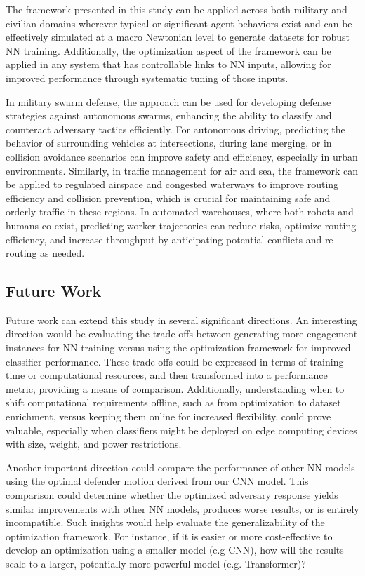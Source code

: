 \documentclass[journal]{IEEEtran} %
\begin{document}
The framework presented in this study can be applied across both military and civilian domains wherever typical or significant agent behaviors exist and can be effectively simulated at a macro Newtonian level to generate datasets for robust NN training. Additionally, the optimization aspect of the framework can be applied in any system that has controllable links to NN inputs, allowing for improved performance through systematic tuning of those inputs.

In military swarm defense, the approach can be used for developing defense strategies against autonomous swarms, enhancing the ability to classify and counteract adversary tactics efficiently. For autonomous driving, predicting the behavior of surrounding vehicles at intersections, during lane merging, or in collision avoidance scenarios can improve safety and efficiency, especially in urban environments. Similarly, in traffic management for air and sea, the framework can be applied to regulated airspace and congested waterways to improve routing efficiency and collision prevention, which is crucial for maintaining safe and orderly traffic in these regions. In automated warehouses, where both robots and humans co-exist, predicting worker trajectories can reduce risks, optimize routing efficiency, and increase throughput by anticipating potential conflicts and re-routing as needed.


\subsection{Future Work}
\label{sec:future_work}


Future work can extend this study in several significant directions. An interesting direction would be evaluating the trade-offs between generating more engagement instances for NN training versus using the optimization framework for improved classifier performance. These trade-offs could be expressed in terms of training time or computational resources, and then transformed into a performance metric, providing a means of comparison. Additionally, understanding when to shift computational requirements offline, such as from optimization to dataset enrichment, versus keeping them online for increased flexibility, could prove valuable, especially when classifiers might be deployed on edge computing devices with size, weight, and power restrictions.

Another important direction could compare the performance of other NN models using the optimal defender motion derived from our CNN model. This comparison could determine whether the optimized adversary response yields similar improvements with other NN models, produces worse results, or is entirely incompatible. Such insights would help evaluate the generalizability of the optimization framework. For instance, if it is easier or more cost-effective to develop an optimization using a smaller model (e.g CNN), how will the results scale to a larger, potentially more powerful model (e.g. Transformer)?
\end{document}

